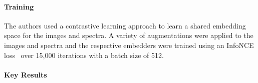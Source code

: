 \paragraph{Training} The authors used a contrastive learning approach to learn a shared embedding space for the images
and spectra.
A variety of augmentations were applied to the images and spectra and the respective embedders were trained using an
InfoNCE loss~\citep{infonce2020} over 15,000 iterations with a batch size of 512.

\paragraph{Key Results}
